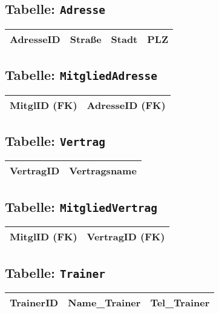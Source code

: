 \documentclass{article}
\begin{document}
	\vspace{1em}
	
	\subsection*{Tabelle: \texttt{Adresse}}
	\begin{tabular}{|l|l|l|l|}
		\hline
		AdresseID & Straße & Stadt & PLZ \\
		\hline
	\end{tabular}
	
	\vspace{1em}
	
	\subsection*{Tabelle: \texttt{MitgliedAdresse}}
	\begin{tabular}{|l|l|}
		\hline
		MitglID (FK) & AdresseID (FK) \\
		\hline
	\end{tabular}
	
	\vspace{1em}
	
	\subsection*{Tabelle: \texttt{Vertrag}}
	\begin{tabular}{|l|l|}
		\hline
		VertragID & Vertragsname \\
		\hline
	\end{tabular}
	
	\vspace{1em}
	
	\subsection*{Tabelle: \texttt{MitgliedVertrag}}
	\begin{tabular}{|l|l|}
		\hline
		MitglID (FK) & VertragID (FK) \\
		\hline
	\end{tabular}
	
	\vspace{1em}
	
	\subsection*{Tabelle: \texttt{Trainer}}
	\begin{tabular}{|l|l|l|}
		\hline
		TrainerID & Name\_Trainer & Tel\_Trainer \\
		\hline
	\end{tabular}
	
\end{document}
